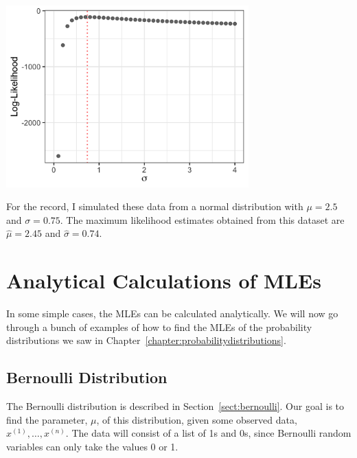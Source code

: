 \begin{center}
\includegraphics[width=0.7\textwidth]{img/normal-likelihood-example-vary-sigma.png}
\end{center}
For the record, I simulated these data from a normal distribution with $\mu=2.5$ and $\sigma=0.75$. The maximum likelihood estimates obtained from this dataset are $\hat{\mu} = 2.45$ and $\hat{\sigma} = 0.74$. 

\section{Analytical Calculations of MLEs}

In some simple cases, the MLEs can be calculated analytically. We will now go through a bunch of examples of how to find the MLEs of the probability distributions we saw in Chapter~\ref{chapter:probabilitydistributions}. 

\subsection{Bernoulli Distribution}

The Bernoulli distribution is described in Section~\ref{sect:bernoulli}. Our goal is to find the parameter, $\mu$, of this distribution, given some observed data, $x^{(1)}, \dots, x^{(n)}$. The data will consist of a list of 1s and 0s, since Bernoulli random variables can only take the values 0 or 1.

